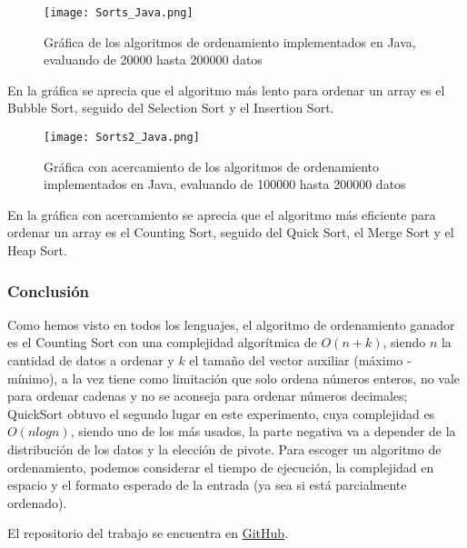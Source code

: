\begin{itemize}
\begin{figure}[H]
	        \centering
	        \texttt{[image: Sorts\_Java.png]}
	        \caption{Gráfica de los algoritmos de ordenamiento implementados en Java, evaluando de 20000 hasta 200000 datos}
		\end{figure}
En la gráfica se aprecia que el algoritmo más lento para ordenar un array es el Bubble Sort, seguido del Selection Sort y el Insertion Sort.
        \begin{figure}[H]
	        \centering
	        \texttt{[image: Sorts2\_Java.png]}
	        \caption{Gráfica con acercamiento de los algoritmos de ordenamiento implementados en Java, evaluando de 100000 hasta 200000 datos}
		\end{figure}
En la gráfica con acercamiento se aprecia que el algoritmo más eficiente para ordenar un array es el Counting Sort, seguido del Quick Sort, el Merge Sort y el Heap Sort.
\end{itemize}

\subsubsection*{Conclusión}
Como hemos visto en todos los lenguajes, el algoritmo de ordenamiento ganador es el Counting Sort con una complejidad algorítmica de $O(n+k)$, siendo $n$ la cantidad de datos a ordenar y $k$ el tamaño del vector auxiliar (máximo - mínimo), a la vez tiene como limitación que solo ordena números enteros, no vale para ordenar cadenas y no se aconseja para ordenar números decimales; QuickSort obtuvo el segundo lugar en este experimento, cuya complejidad es $O(nlogn)$, siendo uno de los más usados, la parte negativa va a depender de la distribución de los datos y la elección de pivote.
Para escoger un algoritmo de ordenamiento, podemos considerar el tiempo de ejecución, la complejidad en espacio y el formato esperado de la entrada (ya sea si está parcialmente ordenado).

El repositorio del trabajo se encuentra en \href{https://github.com/syordya/CSUNSA-EDA}{GitHub}\cite{repo}.

